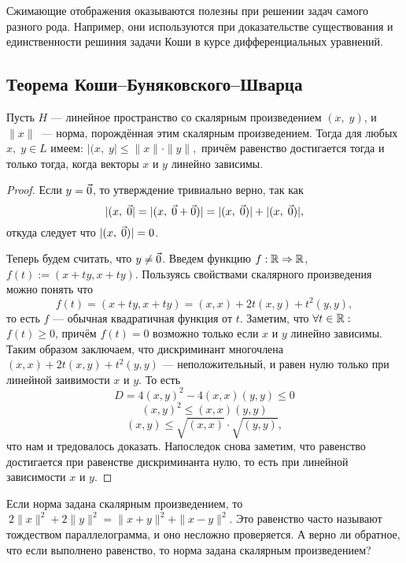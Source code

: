 \documentclass[a4paper, 12pt]{article}
\begin{document}
Сжимающие отображения оказываются полезны при решении задач самого разного рода. Например, они используются при доказательстве существования и единственности решиния задачи Коши в курсе дифференциальных уравнений. 

\subsection*{Теорема Коши--Буняковского--Шварца}


\begin{Theorem}
	Пусть $H$ --- линейное пространство со скалярным произведением $( x,\;y)$, и $\|x\|$ — норма, порождённая этим скалярным произведением. Тогда для любых $x,\;y\in L$ имеем: $|( x,\;y | \leqslant \|x\|\cdot\|y\|,$	причём равенство достигается тогда и только тогда, когда векторы $x$ и $y$ линейно зависимы.
\end{Theorem}
\begin{proof}
	Если $y = \vec{0}$, то утверждение тривиально верно, так как $$ |( x,\;\vec{0} | = |( x,\;\vec{0}+\vec{0})| = |( x,\;\vec{0})|+|( x,\;\vec{0})|,$$
	откуда следует что $|( x,\;\vec{0})| = 0$.
	
	Теперь будем считать, что $y\neq \vec{0}$. Введем функцию $f: \mathbb{R} \Rightarrow\mathbb{R}$, $f(t):=(x+ty, x+ty)$. Пользуясь свойствами скалярного произведения можно понять что $$ f(t) =(x+ty, x+ty) = (x, x)+2t(x, y)+t^2(y, y),$$ то есть $f$ --- обычная квадратичная функция от $t$. Заметим, что $\forall t\in\mathbb{R}:$ $f(t)\geq0$, причём $f(t)=0$ возможно только если $x$ и $y$ линейно зависимы. Таким образом заключаем, что дискриминант многочлена $(x, x)+2t(x, y)+t^2(y, y)$ --- неположительный, и равен нулю только при линейной заивимости $x$ и $y$. То есть 
	\[D = 4(x, y)^2-4(x, x)(y, y)\leq 0\]
	\[(x, y)^2\leq(x, x)(y, y)\]
	\[(x, y)\leq \sqrt{(x, x)}\cdot \sqrt{(y, y)},\]
	что нам и тредовалось доказать. Напоследок снова заметим, что равенство достигается при равенстве дискриминанта нулю, то есть при линейной зависимости $x$ и $y$.
\end{proof}
\begin{Task}
	Если норма задана скалярным произведением, то 
	$\ 2\|x\|^2+2\|y\|^2=\|x+y\|^2+\|x-y\|^2$. Это равенство часто называют тождеством параллелограмма, и оно несложно проверяется. А верно ли обратное, что если выполнено равенство, то норма задана скалярным произведением?
\end{Task}
\end{document}
